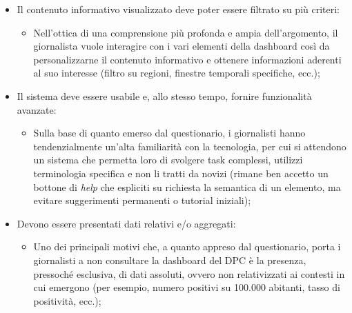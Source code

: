\begin{itemize}
	\item Il contenuto informativo visualizzato deve poter essere filtrato su più criteri:
	\begin{itemize}
        \item Nell'ottica di una comprensione più profonda e ampia dell'argomento, il giornalista vuole interagire con i vari elementi della dashboard così da personalizzarne il contenuto informativo e ottenere informazioni aderenti al suo interesse (filtro su regioni, finestre temporali specifiche, ecc.);
    \end{itemize}
	\item Il sistema deve essere usabile e, allo stesso tempo, fornire funzionalità avanzate:
	\begin{itemize}
        \item Sulla base di quanto emerso dal questionario, i giornalisti hanno tendenzialmente un'alta familiarità con la tecnologia, per cui si attendono un sistema che permetta loro di svolgere task complessi, utilizzi terminologia specifica e non li tratti da novizi (rimane ben accetto un bottone di \textit{help} che espliciti su richiesta la semantica di un elemento, ma evitare suggerimenti permanenti o tutorial iniziali);
    \end{itemize}
	\item Devono essere presentati dati relativi e/o aggregati:
	\begin{itemize}
        \item Uno dei principali motivi che, a quanto appreso dal questionario, porta i giornalisti a non consultare la dashboard del DPC è la presenza, pressoché esclusiva, di dati assoluti, ovvero non relativizzati ai contesti in cui emergono (per esempio, numero positivi su 100.000 abitanti, tasso di positività, ecc.);
    \end{itemize}
\end{itemize}
